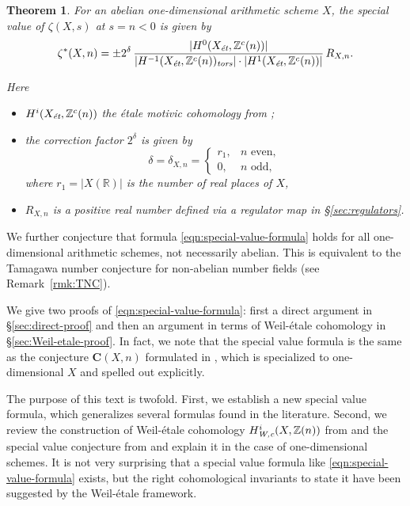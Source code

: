 \documentclass[draft]{article}
\newcommand{\RR}{\mathbb{R}}
\newcommand{\ZZ}{\mathbb{Z}}
\newcommand{\et}{\text{\it \'{e}t}}
\newcommand{\tors}{\text{\it tors}}
\newcommand{\Wc}{\text{\it W,c}}
\theoremstyle{myplain}
\newtheorem{theorem}{Theorem}[section]
\theoremstyle{mydefinition}
\begin{document}
\begin{theorem}
  \label{main-theorem}
  For an abelian one-dimensional arithmetic scheme $X$, the special value of
  $\zeta (X,s)$ at $s = n < 0$ is given by
  \begin{equation}
    \label{eqn:special-value-formula}
    \zeta^* (X,n) =
    \pm 2^\delta\,\frac{|H^0 (X_\et, \ZZ^c (n))|}{|H^{-1} (X_\et, \ZZ^c (n))_\tors| \cdot |H^1 (X_\et, \ZZ^c (n))|}\,R_{X,n}.
  \end{equation}

  Here
  \begin{itemize}
  \item $H^i (X_\et, \ZZ^c (n))$ the \'{e}tale motivic cohomology
    from \cite{Geisser-2010};

  \item the correction factor $2^\delta$ is given by
    \begin{equation}
      \label{eqn:delta}
      \delta = \delta_{X,n} =
      \begin{cases}
        r_1, & n \text{ even}, \\
        0, & n \text{ odd},
      \end{cases}
    \end{equation}
    where $r_1 = |X (\RR)|$ is the number of real places of $X$,

  \item $R_{X,n}$ is a positive real number defined
    via a regulator map in \S\ref{sec:regulators}.
  \end{itemize}
\end{theorem}

We further conjecture that formula \eqref{eqn:special-value-formula} holds for
all one-dimensional arithmetic schemes, not necessarily abelian. This is
equivalent to the Tamagawa number conjecture for non-abelian number fields
(see Remark~\ref{rmk:TNC}).

\vspace{1em}

We give two proofs of \eqref{eqn:special-value-formula}: first a direct argument
in \S\ref{sec:direct-proof} and then an argument in terms of Weil-\'{e}tale
cohomology in \S\ref{sec:Weil-etale-proof}. In fact, we note that the special
value formula is the same as the conjecture $\mathbf{C} (X,n)$ formulated in
\cite{Beshenov-Weil-etale-2}, which is specialized to one-dimensional $X$ and
spelled out explicitly.

The purpose of this text is twofold. First, we establish a new special value
formula, which generalizes several formulas found in the literature. Second, we
review the construction of Weil-\'{e}tale cohomology $H^i_\Wc (X, \ZZ(n))$ from
\cite{Beshenov-Weil-etale-1} and the special value conjecture from
\cite{Beshenov-Weil-etale-2} and explain it in the case of one-dimensional
schemes. It is not very surprising that a special value formula like
\eqref{eqn:special-value-formula} exists, but the right cohomological invariants
to state it have been suggested by the Weil-\'{e}tale framework.
\end{document}

